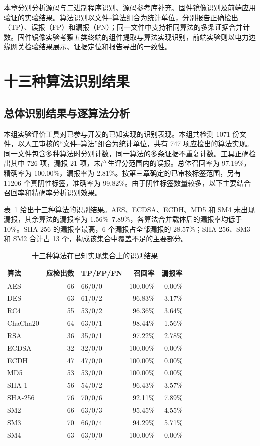 本章分别分析源码与二进制程序识别、源码参考库补充、固件镜像识别及前端应用验证的实验结果。算法识别以文件--算法组合为统计单位，分别报告正确检出（TP）、误报（FP）和漏报（FN）；同一文件中支持相同算法的多条证据合并计数。固件镜像实验考察五类终端的组件提取与算法实现识别，前端实验则以电力边缘网关检验结果展示、证据定位和报告导出的一致性。

\section{十三种算法识别结果}
\label{sec:algorithm-suite-results}

\subsection{总体识别结果与逐算法分析}

本组实验评价工具对已参与开发的已知实现的识别表现。本组共检测 1071 份文件，以人工审核的“文件--算法”组合为统计单位，共有 747 项应检出的算法实现。同一文件包含多种算法时分别计数，同一算法的多条证据不重复计数。工具正确检出其中 726 项，漏报 21 项，未产生评分范围内的误报。总体召回率为 97.19\%，精确率为 100.00\%，漏报率为 2.81\%。按第三章确定的已审核标签范围，另有 11206 个真阴性标签，准确率为 99.82\%。由于阴性标签数量较多，以下主要结合召回率和精确率分析识别效果。

表~\ref{tab:algorithm-suite-algorithms} 给出十三种算法的识别结果。AES、ECDSA、ECDH、MD5 和 SM4 未出现漏报，其余算法的漏报率为 1.56\%--7.89\%，各算法合并载体后的漏报率均低于 10\%。SHA-256 的漏报率最高，6 个漏报占全部漏报的 28.57\%；SHA-256、SM3 和 SM2 合计占 13 个，构成该集合中覆盖不足的主要部分。

\begin{table}[!htbp]\centering\small
\caption{十三种算法在已知实现集合上的识别结果}
\label{tab:algorithm-suite-algorithms}
\begin{tabularx}{\linewidth}{@{}Xrlrr@{}}\toprule
算法 & 应检出数 & TP/FP/FN & 召回率 & 漏报率\\\midrule
AES & 66 & 66/0/0 & 100.00\% & 0.00\%\\
DES & 63 & 61/0/2 & 96.83\% & 3.17\%\\
RC4 & 55 & 53/0/2 & 96.36\% & 3.64\%\\
ChaCha20 & 64 & 63/0/1 & 98.44\% & 1.56\%\\
RSA & 36 & 35/0/1 & 97.22\% & 2.78\%\\
ECDSA & 32 & 32/0/0 & 100.00\% & 0.00\%\\
ECDH & 47 & 47/0/0 & 100.00\% & 0.00\%\\
MD5 & 53 & 53/0/0 & 100.00\% & 0.00\%\\
SHA-1 & 56 & 54/0/2 & 96.43\% & 3.57\%\\
SHA-256 & 76 & 70/0/6 & 92.11\% & 7.89\%\\
SM2 & 66 & 63/0/3 & 95.45\% & 4.55\%\\
SM3 & 70 & 66/0/4 & 94.29\% & 5.71\%\\
SM4 & 63 & 63/0/0 & 100.00\% & 0.00\%\\\bottomrule
\end{tabularx}
\end{table}

